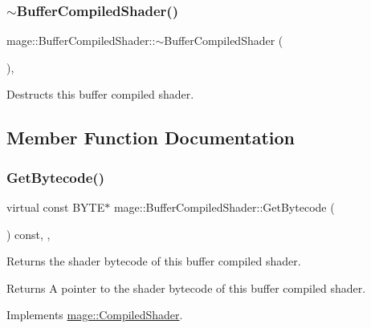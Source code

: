 \subsubsection{\texorpdfstring{$\sim$\+Buffer\+Compiled\+Shader()}{~BufferCompiledShader()}}
{\footnotesize\ttfamily mage\+::\+Buffer\+Compiled\+Shader\+::$\sim$\+Buffer\+Compiled\+Shader (\begin{DoxyParamCaption}{ }\end{DoxyParamCaption})\hspace{0.3cm}{\ttfamily [virtual]}, {\ttfamily [default]}}

Destructs this buffer compiled shader. 

\subsection{Member Function Documentation}
\hypertarget{structmage_1_1_buffer_compiled_shader_ae6b2b4b5c9b96d7ca680724ccf0affb3}{}\label{structmage_1_1_buffer_compiled_shader_ae6b2b4b5c9b96d7ca680724ccf0affb3} 
\subsubsection{\texorpdfstring{Get\+Bytecode()}{GetBytecode()}}
{\footnotesize\ttfamily virtual const B\+Y\+TE$\ast$ mage\+::\+Buffer\+Compiled\+Shader\+::\+Get\+Bytecode (\begin{DoxyParamCaption}{ }\end{DoxyParamCaption}) const\hspace{0.3cm}{\ttfamily [override]}, {\ttfamily [virtual]}, {\ttfamily [noexcept]}}

Returns the shader bytecode of this buffer compiled shader.

\begin{DoxyReturn}{Returns}
A pointer to the shader bytecode of this buffer compiled shader. 
\end{DoxyReturn}


Implements \hyperlink{structmage_1_1_compiled_shader_a3d7a58d568dc30e66ea7488f28911127}{mage\+::\+Compiled\+Shader}.

\hypertarget{structmage_1_1_buffer_compiled_shader_aa9ab3a1df896367280c259734ff29bc0}{}\label{structmage_1_1_buffer_compiled_shader_aa9ab3a1df896367280c259734ff29bc0} 
